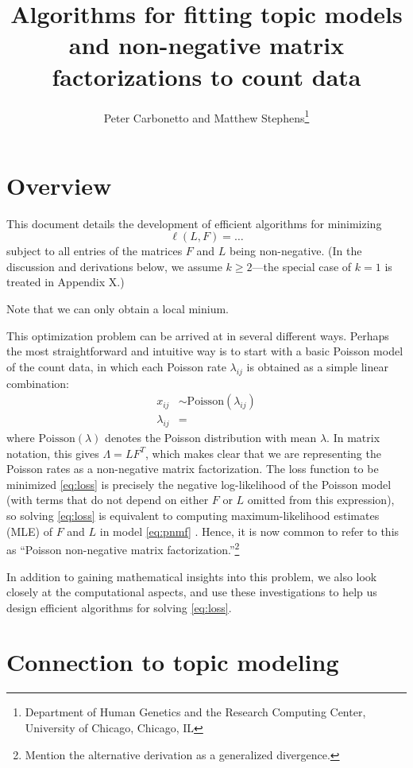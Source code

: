\documentclass[final]{siamart171218}
\title{Algorithms for fitting topic models and non-negative matrix 
  factorizations to count data}
\author{Peter Carbonetto and Matthew Stephens\thanks{Department of 
  Human Genetics and the Research Computing Center, University of 
  Chicago, Chicago, IL}}
\begin{document}
\maketitle

\section{Overview}

This document details the development of efficient algorithms for
minimizing 
\begin{equation}
\ell(L,F) = \ldots
\label{eq:loss}
\end{equation}
subject to all entries of the matrices $F$ and $L$ being
non-negative. (In the discussion and derivations below, we assume $k
\geq 2$---the special case of $k = 1$ is treated in Appendix X.)

Note that we can only obtain a local minium.

This optimization problem can be arrived at in several different
ways. Perhaps the most straightforward and intuitive way is to start
with a basic Poisson model of the count data, in which each Poisson
rate $\lambda_{ij}$ is obtained as a simple linear combination:
\begin{align*}
x_{ij}       &\sim \mathrm{Poisson}(\lambda_{ij}) \\
\lambda_{ij} &=
\label{eq:pnmf}
\end{align*}
where $\mathrm{Poisson}(\lambda)$ denotes the Poisson distribution with
mean $\lambda$. In matrix notation, this gives $\Lambda = LF^T$, which
makes clear that we are representing the Poisson rates as a
non-negative matrix factorization. The loss function to be minimized
\eqref{eq:loss} is precisely the negative log-likelihood of the
Poisson model (with terms that do not depend on either $F$ or $L$
omitted from this expression), so solving \eqref{eq:loss} is
equivalent to computing maximum-likelihood estimates (MLE) of $F$ and
$L$ in model \eqref{eq:pnmf} . Hence, it is now common to refer to
this as ``Poisson non-negative matrix
factorization.''\footnote{Mention the alternative derivation as a
  generalized divergence.}

In addition to gaining mathematical insights into this problem, we
also look closely at the computational aspects, and use these
investigations to help us design efficient algorithms for
solving \eqref{eq:loss}.

\section{Connection to topic modeling}
\end{document}
